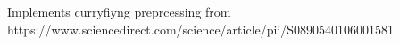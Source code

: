 Implements curryfiyng preprcessing from https://www.sciencedirect.com/science/article/pii/S0890540106001581
